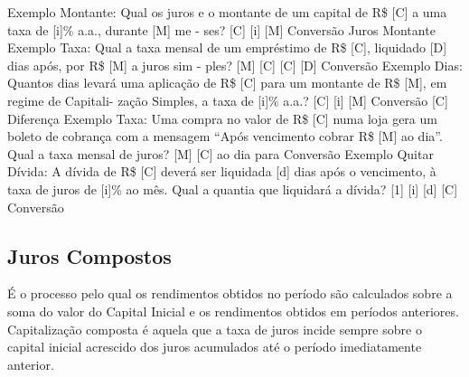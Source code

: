 Exemplo Montante: Qual os juros e o montante de um capital de R\$ [C] a uma taxa de [i]\% a.a., durante [M] me -
ses?
[C]
[i]
[M]
Conversão
Juros Montante
Exemplo Taxa: Qual a taxa mensal de um empréstimo de R\$ [C], liquidado [D] dias após, por R\$ [M] a juros sim -
ples?
[M]
[C]
[C]
[D]
Conversão
Exemplo Dias: Quantos dias levará uma aplicação de R\$ [C] para um montante de R\$ [M], em regime de Capitali-
zação Simples, a taxa de [i]\% a.a.?
[C]
[i]
[M]
Conversão
[C]
Diferença
Exemplo Taxa: Uma compra no valor de R\$ [C] numa loja gera um boleto de cobrança com a mensagem “Após
vencimento cobrar R\$ [M] ao dia”. Qual a taxa mensal de juros?
[M]
[C]
ao dia
para %
Conversão
Exemplo Quitar Dívida: A dívida de R\$ [C] deverá ser liquidada [d] dias após o vencimento, à taxa de juros de [i]\%
ao mês. Qual a quantia que liquidará a dívida?
[1]
[i]
[d]
[C]
Conversão

\subsection*{Juros Compostos}
É o processo pelo qual os rendimentos obtidos no período são calculados sobre a soma do valor do Capital Inicial e os rendimentos obtidos em períodos anteriores. Capitalização composta é aquela que a taxa de juros incide sempre sobre o capital inicial acrescido dos juros acumulados até o período imediatamente anterior.